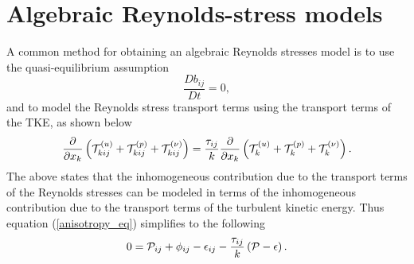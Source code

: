 \documentclass[oneside,a4paper,11pt]{report}
\begin{document}
\section{Algebraic Reynolds-stress models}

A common method for obtaining an algebraic Reynolds stresses model is to use the quasi-equilibrium assumption
\begin{equation}
\frac{D b_{ij}}{Dt} = 0,
\end{equation}
and to model the Reynolds stress transport terms using the transport terms of the TKE, as shown below
\begin{equation}
\frac{\partial}{\partial x_k} \left ( \mathcal{T}^{(u)}_{kij} + \mathcal{T}^{(p)}_{kij} + \mathcal{T}^{(\nu)}_{kij} \right ) = \frac{\tau_{ij}}{k} \frac{\partial}{\partial x_k} \left ( \mathcal{T}^{(u)}_{k} + \mathcal{T}^{(p)}_{k} + \mathcal{T}^{(\nu)}_{k} \right ).
\end{equation} 
The above states that the inhomogeneous contribution due to the transport terms of the Reynolds stresses can be modeled in terms of the inhomogeneous contribution due to the transport terms of the turbulent kinetic energy. Thus equation (\ref{anisotropy_eq}) simplifies to the following
\begin{equation}
\label{algebraic_rs}
0 = \mathcal{P}_{ij} + \phi_{ij} - \epsilon_{ij} - \frac{\tau_{ij}}{k} \left ( \mathcal{P} - \epsilon \right ).
\end{equation}
\end{document}
